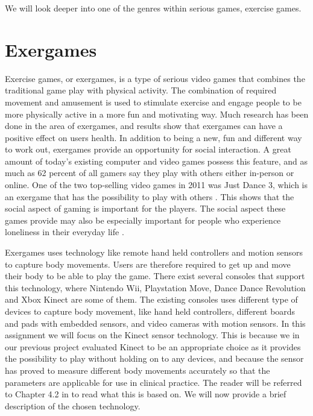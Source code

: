 We will look deeper into one of the genres within serious games, exercise games.  

\section{Exergames}
\label{sec:exergames}
Exercise games, or exergames, is a type of serious video games that combines the traditional game play with physical activity. The combination of required movement and amusement is used to stimulate exercise and engage people to be more physically active in a more fun and motivating way. Much research has been done in the area of exergames, and results show that exergames can have a positive effect on users health. In addition to being a new, fun and different way to work out, exergames provide an opportunity for social interaction. A great amount of today’s existing computer and video games possess this feature, and as much as 62 percent of all gamers say they play with others either in-person or online. One of the two top-selling video games in 2011 was Just Dance 3, which is an exergame that has the possibility to play with others \cite{statistics2012}. This shows that the social aspect of gaming is important for the players. The social aspect these games provide may also be especially important for people who experience loneliness in their everyday life \cite{exergamesforelderly}.

Exergames uses technology like remote hand held controllers and motion sensors to capture body movements. Users are therefore required to get up and move their body to be able to play the game. There exist several consoles that support this technology, where Nintendo Wii, Playstation Move, Dance Dance Revolution and Xbox Kinect are some of them. The existing consoles uses different type of devices to capture body movement, like hand held controllers, different boards and pads with embedded sensors, and video cameras with motion sensors. In this assignment we will focus on the Kinect sensor technology. This is because we in our previous project evaluated Kinect to be an appropriate choice as it provides the possibility to play without holding on to any devices, and because the sensor has proved to measure different body movements accurately so that the parameters are applicable for use in clinical practice. The reader will be referred to Chapter 4.2 in \cite{project} to read what this is based on. We will now provide a brief description of the chosen technology.

